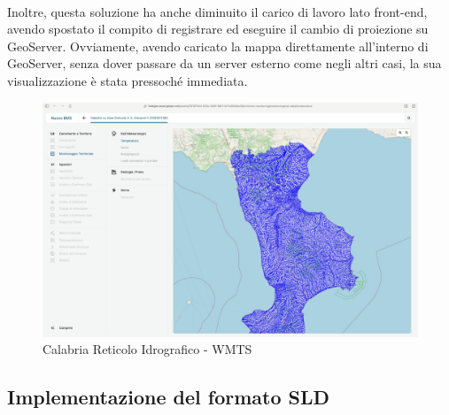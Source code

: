 \\Inoltre, questa soluzione ha anche diminuito il carico di lavoro lato front-end, avendo spostato il compito di registrare ed eseguire il cambio di proiezione su GeoServer. Ovviamente, avendo caricato la mappa direttamente all'interno di GeoServer, senza dover passare da un server esterno come negli altri casi, la sua visualizzazione è stata pressoché immediata.
\begin{figure}[htbp]
      \centering
      \includegraphics[width=1\textwidth]{Tesi/images/Capitolo5/calabriaAlluvioni.jpg}
      \caption{Calabria Reticolo Idrografico - WMTS}
      \label{fig:calabriaAlluvioni}
\end{figure}
\newpage
\subsection{Implementazione del formato SLD}

